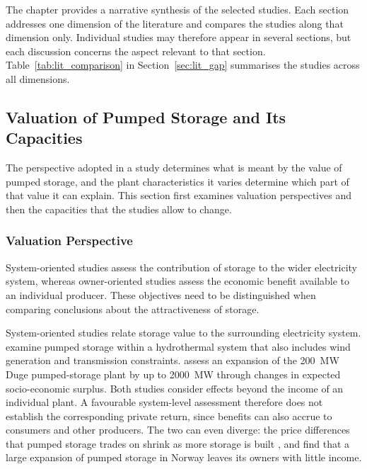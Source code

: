 
The chapter provides a narrative synthesis of the selected studies. Each
section addresses one dimension of the literature and compares the
studies along that dimension only. Individual studies may therefore
appear in several sections, but each discussion concerns the aspect
relevant to that section. Table~\ref{tab:lit_comparison} in
Section~\ref{sec:lit_gap} summarises the studies across all dimensions.

\subsection{Valuation of Pumped Storage and Its Capacities}
\label{sec:lit_valuation}

The perspective adopted in a study determines what is meant by the value
of pumped storage, and the plant characteristics it varies determine
which part of that value it can explain. This section first examines
valuation perspectives and then the capacities that the studies allow
to change.

\subsubsection{Valuation Perspective}
\label{sec:lit_perspective}

System-oriented studies assess the contribution of storage to the wider
electricity system, whereas owner-oriented studies assess the economic
benefit available to an individual producer. These objectives need to be
distinguished when comparing conclusions about the attractiveness of
storage.

System-oriented studies relate storage value to the surrounding
electricity system. \citet{helseth2013} examine pumped storage within a
hydrothermal system that also includes wind generation and transmission
constraints. \citet{helseth2017} assess an expansion of the
\SI{200}{\mega\watt} Duge pumped-storage plant by up to
\SI{2000}{\mega\watt} through changes in expected socio-economic surplus.
Both studies consider effects beyond the income of an individual plant.
A favourable system-level assessment therefore does not establish the
corresponding private return, since benefits can also accrue to
consumers and other producers. The two can even diverge: the price
differences that pumped storage trades on shrink as more storage is
built \citep{dallinger2019socioeconomic}, and \citet{henden2016economic}
find that a large expansion of pumped storage in Norway leaves its
owners with little income.

